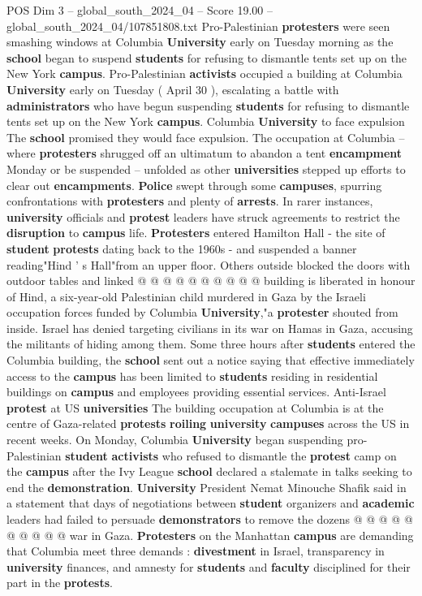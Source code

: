 \begin{textsample}{POS Dim 3 – global\_south\_2024\_04 – Score 19.00 – global\_south\_2024\_04/107851808.txt}  \label{ex:f3_pos_192}
Pro-Palestinian \textbf{protesters} were seen smashing windows at Columbia \textbf{University} early on Tuesday morning as the \textbf{school} began to suspend \textbf{students} for refusing to dismantle tents set up on the New York \textbf{campus}.
Pro-Palestinian \textbf{activists} occupied a building at Columbia \textbf{University} early on Tuesday ( April 30 ), escalating a battle with \textbf{administrators} who have begun suspending \textbf{students} for refusing to dismantle tents set up on the New York \textbf{campus}.
Columbia \textbf{University} to face expulsion The \textbf{school} promised they would face expulsion.
The occupation at Columbia -- where \textbf{protesters} shrugged off an ultimatum to abandon a tent \textbf{encampment} Monday or be suspended -- unfolded as other \textbf{universities} stepped up efforts to clear out \textbf{encampments}. \textbf{Police} swept through some \textbf{campuses}, spurring confrontations with \textbf{protesters} and plenty of \textbf{arrests}.
In rarer instances, \textbf{university} officials and \textbf{protest} leaders have struck agreements to restrict the \textbf{disruption} to \textbf{campus} life. \textbf{Protesters} entered Hamilton Hall - the site of \textbf{student} \textbf{protests} dating back to the 1960s - and suspended a banner reading"Hind ' s Hall"from an upper floor.
Others outside blocked the doors with outdoor tables and linked @ @ @ @ @ @ @ @ @ @ building is liberated in honour of Hind, a six-year-old Palestinian child murdered in Gaza by the Israeli occupation forces funded by Columbia \textbf{University},"a \textbf{protester} shouted from inside.
Israel has denied targeting civilians in its war on Hamas in Gaza, accusing the militants of hiding among them.
Some three hours after \textbf{students} entered the Columbia building, the \textbf{school} sent out a notice saying that effective immediately access to the \textbf{campus} has been limited to \textbf{students} residing in residential buildings on \textbf{campus} and employees providing essential services.
Anti-Israel \textbf{protest} at US \textbf{universities} The building occupation at Columbia is at the centre of Gaza-related \textbf{protests} \textbf{roiling} \textbf{university} \textbf{campuses} across the US in recent weeks.
On Monday, Columbia \textbf{University} began suspending pro-Palestinian \textbf{student} \textbf{activists} who refused to dismantle the \textbf{protest} camp on the \textbf{campus} after the Ivy League \textbf{school} declared a stalemate in talks seeking to end the \textbf{demonstration}. \textbf{University} President Nemat Minouche Shafik said in a statement that days of negotiations between \textbf{student} organizers and \textbf{academic} leaders had failed to persuade \textbf{demonstrators} to remove the dozens @ @ @ @ @ @ @ @ @ @ war in Gaza. \textbf{Protesters} on the Manhattan \textbf{campus} are demanding that Columbia meet three demands : \textbf{divestment} in Israel, transparency in \textbf{university} finances, and amnesty for \textbf{students} and \textbf{faculty} disciplined for their part in the \textbf{protests}.

\end{textsample}
